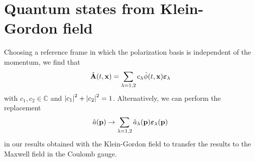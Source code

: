 \section{Quantum states from Klein-Gordon field}

Choosing a reference frame in which the polarization basis is independent of the momentum, we find that
\begin{equation}
	\hat{\vb{A}}(t,\vb{x})
	=
	\sum_{\lambda=1,2}
	c_\lambda
	\hat\phi(t,\vb{x})
	\boldsymbol{\varepsilon}_\lambda
\end{equation}
with $c_1,c_2\in\mathbb{C}$ and $\abs{c_1}^2+\abs{c_2}^2=1$.
Alternatively, we can perform the replacement
\begin{equation}
	\hat{a}(\vb{p})
	\to
	\sum_{\lambda=1,2}
	\hat{a}_\lambda(\vb{p})
	\boldsymbol{\varepsilon}_\lambda(\vb{p})
\end{equation}
in our results obtained with the Klein-Gordon field to transfer the results to the Maxwell field in the Coulomb gauge.